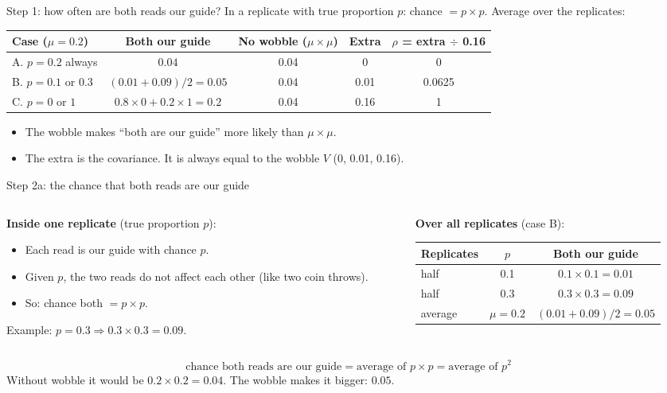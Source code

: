 \documentclass[aspectratio=169,11pt]{beamer}
\begin{document}
\begin{frame}{Step 1: how often are both reads our guide?}
In a replicate with true proportion $p$: chance $= p \times p$. Average over
the replicates:
\medskip

\small
\renewcommand{\arraystretch}{1.3}\setlength{\tabcolsep}{4pt}
\begin{tabular}{@{}lcccc@{}}
\toprule
Case ($\mu = 0.2$) & Both our guide & No wobble ($\mu\times\mu$) & Extra & $\rho$ = extra $\div$ 0.16\\
\midrule
A. $p = 0.2$ always & $0.04$ & 0.04 & 0 & 0\\
B. $p = 0.1$ or $0.3$ & $(0.01 + 0.09)/2 = 0.05$ & 0.04 & 0.01 & 0.0625\\
C. $p = 0$ or $1$ & $0.8 \times 0 + 0.2 \times 1 = 0.2$ & 0.04 & 0.16 & 1\\
\bottomrule
\end{tabular}
\normalsize
\medskip

\begin{itemize}
\item The wobble makes ``both are our guide'' \alert{more likely} than
  $\mu \times \mu$.
\item The extra is the \alert{covariance}. It is always equal to the wobble
  $V$ (0, 0.01, 0.16).
\end{itemize}
\end{frame}

\begin{frame}{Step 2a: the chance that both reads are our guide}
\begin{columns}[T]
\begin{column}{0.44\textwidth}
\textbf{Inside one replicate} (true proportion $p$):
\begin{itemize}\small
\item Each read is our guide with chance $p$.
\item Given $p$, the two reads do not affect each other (like two coin
  throws).
\item So: chance both $= p \times p$.
\end{itemize}
{\small Example: $p = 0.3 \Rightarrow 0.3 \times 0.3 = 0.09$.}
\end{column}
\begin{column}{0.52\textwidth}
\textbf{Over all replicates} (case B):
\medskip

\small
\begin{tabular}{@{}lcc@{}}
\toprule
Replicates & $p$ & Both our guide\\
\midrule
half & 0.1 & $0.1 \times 0.1 = 0.01$\\
half & 0.3 & $0.3 \times 0.3 = 0.09$\\
\midrule
average & $\mu = 0.2$ & $(0.01 + 0.09)/2 = \mathbf{0.05}$\\
\bottomrule
\end{tabular}
\end{column}
\end{columns}
\[
\text{chance both reads are our guide} = \text{average of } p \times p = \text{average of } p^2
\]
{\small Without wobble it would be $0.2 \times 0.2 = 0.04$. The wobble makes
it bigger: $0.05$.}
\end{frame}
\end{document}
